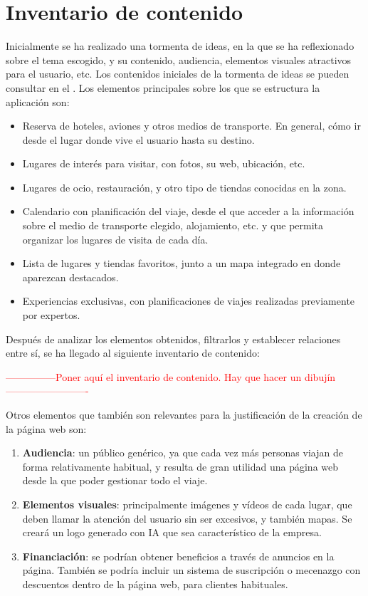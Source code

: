 \documentclass[11pt, a4paper]{book}
\begin{document}
	
	
	\section{Inventario de contenido}
	Inicialmente se ha realizado una tormenta de ideas, en la que se ha reflexionado sobre el tema escogido, y su contenido, audiencia, elementos visuales atractivos para el usuario, etc. Los contenidos iniciales de la tormenta de ideas se pueden consultar en el . Los elementos principales sobre los que se estructura la aplicación son:
	
	\begin{itemize}
		\item Reserva de hoteles, aviones y otros medios de transporte. En general, cómo ir desde el lugar donde vive el usuario hasta su destino.
		\item Lugares de interés para visitar, con fotos, su web, ubicación, etc. 
		\item Lugares de ocio, restauración, y otro tipo de tiendas conocidas en la zona.
		\item Calendario con planificación del viaje, desde el que acceder a la información sobre el medio de transporte elegido, alojamiento, etc. y que permita organizar los lugares de visita de cada día.
		\item Lista de lugares y tiendas favoritos, junto a un mapa integrado en donde aparezcan destacados.
		\item Experiencias exclusivas, con planificaciones de viajes realizadas previamente por expertos.
	\end{itemize} 
	
	Después de analizar los elementos obtenidos, filtrarlos y establecer relaciones entre sí, se ha llegado al siguiente inventario de contenido:

	\textcolor{red}{---------------Poner aquí el inventario de contenido. Hay que hacer un dibujín -------------------------}
	
	Otros elementos que también son relevantes para la justificación de la creación de la página web son:
	
	\begin{enumerate}
		\item \textbf{Audiencia}: un público genérico, ya que cada vez más personas viajan de forma relativamente habitual, y resulta de gran utilidad una página web desde la que poder gestionar todo el viaje.
		\item \textbf{Elementos visuales}: principalmente imágenes y vídeos de cada lugar, que deben llamar la atención del usuario sin ser excesivos, y también mapas. Se creará un logo generado con IA que sea característico de la empresa.
		\item \textbf{Financiación}: se podrían obtener beneficios a través de anuncios en la página. También se podría incluir un sistema de suscripción o mecenazgo con descuentos dentro de la página web, para clientes habituales.
	\end{enumerate}
\end{document}
